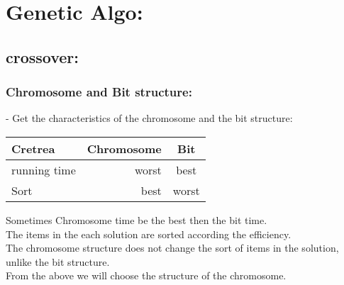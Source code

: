 \section{Genetic Algo:}
\subsection{crossover:}
\subsubsection{Chromosome and Bit structure:}
- Get the characteristics of the chromosome and the bit structure:
\begin{center}
	\begin{tabular}{|l|r|c|}
			\hline
			Cretrea & Chromosome & Bit \tabularnewline
			\hline
			running time & worst & best\tabularnewline
			\hline
			Sort & best & worst \tabularnewline
			\hline
		\end{tabular}
\end{center}
Sometimes Chromosome time be the best then the bit time.\\
The items in the each solution are sorted according the efficiency.\\
The chromosome structure does not change the sort of items in the solution, unlike the bit structure.\\
From the above we will choose the structure of the chromosome.
		